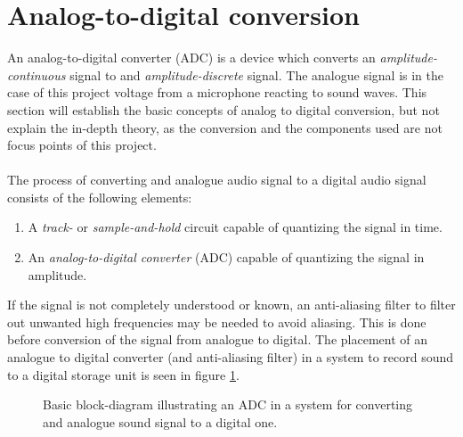 \section{Analog-to-digital conversion}\label{ADC}
An analog-to-digital converter (ADC) is a device which converts an \textit{amplitude-continuous} signal to and \textit{amplitude-discrete} signal.  The analogue signal is in the case of this project voltage from a microphone reacting to sound waves. This section will establish the basic concepts of analog to digital conversion, but not explain the in-depth theory, as the conversion and the components used are not focus points of this project.
\\\\
The process of converting and analogue audio signal to a digital audio signal consists of the following elements:
\begin{enumerate}
\item A \textit{track-} or \textit{sample-and-hold} circuit capable of quantizing the signal in time.
\item An \textit{analog-to-digital converter} (ADC) capable of quantizing the signal in amplitude.
\end{enumerate}
If the signal is not completely understood or known, an anti-aliasing filter to filter out unwanted high frequencies may be needed to avoid aliasing. This is done before conversion of the signal from analogue to digital. The placement of an analogue to digital converter (and anti-aliasing filter) in a system to record sound to a digital storage unit is seen in figure \ref{fig:input}.
\begin{figure}[H]
\centering
{}
\caption{Basic block-diagram illustrating an ADC in a system for converting and analogue sound signal to a digital one.} 
\label{fig:input}
\end{figure}
%
